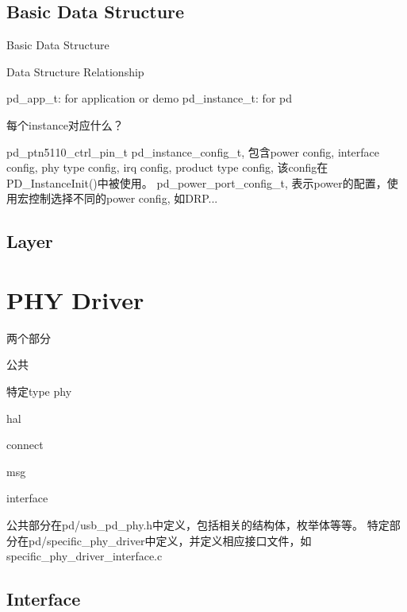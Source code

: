 \subsection*{Basic Data Structure}


\begin{DoxyItemize}
\item Basic Data Structure
\item Data Structure Relationship
\end{DoxyItemize}

pd\-\_\-app\-\_\-t\-: for application or demo pd\-\_\-instance\-\_\-t\-: for pd


\begin{DoxyItemize}
\item 每个instance对应什么？
\end{DoxyItemize}

pd\-\_\-ptn5110\-\_\-ctrl\-\_\-pin\-\_\-t pd\-\_\-instance\-\_\-config\-\_\-t, 包含power config, interface config, phy type config, irq config, product type config, 该config在\-P\-D\-\_\-\-Instance\-Init()中被使用。 pd\-\_\-power\-\_\-port\-\_\-config\-\_\-t, 表示power的配置，使用宏控制选择不同的power config, 如\-D\-R\-P...

\subsection*{Layer}

\section*{P\-H\-Y Driver}

两个部分


\begin{DoxyItemize}
\item 公共
\item 特定type phy
\begin{DoxyItemize}
\item hal
\item connect
\item msg
\item interface
\end{DoxyItemize}
\end{DoxyItemize}

公共部分在pd/usb\-\_\-pd\-\_\-phy.h中定义，包括相关的结构体，枚举体等等。 特定部分在pd/specific\-\_\-phy\-\_\-driver中定义，并定义相应接口文件，如specific\-\_\-phy\-\_\-driver\-\_\-interface.c

\subsection*{Interface}

